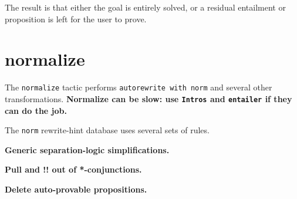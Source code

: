 \documentclass[12pt,fleqn,openany,oneside,showtrims]{memoir}
\begin{document}
The result is that either the goal is entirely solved, or a residual entailment or proposition is left for the user to prove.

\chapter{normalize}
\label{refcard:normalize}
The \lstinline{normalize} tactic performs
\lstinline{autorewrite with norm} and several other transformations.
\textbf{Normalize can be slow:
  use \lstinline{Intros} and \lstinline{entailer}
  if they can do the job.}

The \lstinline{norm} rewrite-hint database uses several sets of rules.

\textbf{Generic separation-logic simplifications.}
\textbf{Pull \EX and !! out of *-conjunctions.}
\textbf{Delete auto-provable propositions.}
\end{document}
